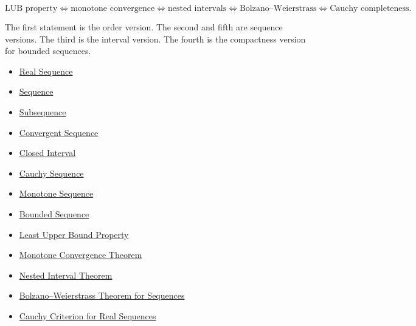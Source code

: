 \begin{remark*}
\[
\text{LUB property}
\Longleftrightarrow
\text{monotone convergence}
\Longleftrightarrow
\text{nested intervals}
\Longleftrightarrow
\text{Bolzano--Weierstrass}
\Longleftrightarrow
\text{Cauchy completeness}.
\]
\end{remark*}

\begin{remark*}[Interpretation]
The first statement is the order version. The second and fifth are sequence
versions. The third is the interval version. The fourth is the compactness
version for bounded sequences.
\end{remark*}

\begin{dependencies}
\begin{itemize}
  \item \hyperref[def:real-sequence]{Real Sequence}
  \item \hyperref[def:sequence]{Sequence}
  \item \hyperref[def:subsequence-of-sequence]{Subsequence}
  \item \hyperref[def:convergent-sequence]{Convergent Sequence}
  \item \hyperref[def:closed-interval]{Closed Interval}
  \item \hyperref[def:cauchy-sequence]{Cauchy Sequence}
  \item \hyperref[def:monotone-sequence]{Monotone Sequence}
  \item \hyperref[def:bounded-sequence]{Bounded Sequence}
  \item \hyperref[def:least-upper-bound-property]{Least Upper Bound Property}
  \item \hyperref[thm:monotone-convergence-theorem]{Monotone Convergence Theorem}
  \item \hyperref[thm:nested-interval-theorem]{Nested Interval Theorem}
  \item \hyperref[thm:bolzano-weierstrass-sequences]{Bolzano--Weierstrass Theorem for Sequences}
  \item \hyperref[thm:cauchy-criterion-real-sequences]{Cauchy Criterion for Real Sequences}
\end{itemize}
\end{dependencies}
